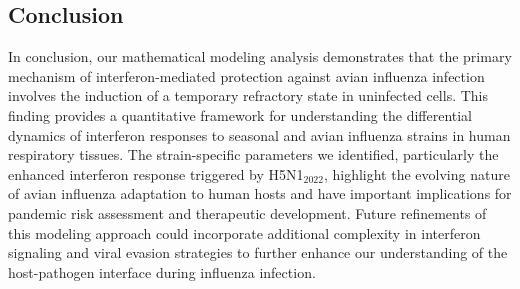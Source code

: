 \documentclass[12pt]{article}
\begin{document}
\subsection{Conclusion}
In conclusion, our mathematical modeling analysis demonstrates that the primary mechanism of interferon-mediated protection against avian influenza infection involves the induction of a temporary refractory state in uninfected cells. This finding provides a quantitative framework for understanding the differential dynamics of interferon responses to seasonal and avian influenza strains in human respiratory tissues. The strain-specific parameters we identified, particularly the enhanced interferon response triggered by H5N1$_{2022}$, highlight the evolving nature of avian influenza adaptation to human hosts and have important implications for pandemic risk assessment and therapeutic development. Future refinements of this modeling approach could incorporate additional complexity in interferon signaling and viral evasion strategies to further enhance our understanding of the host-pathogen interface during influenza infection.


\end{document}
